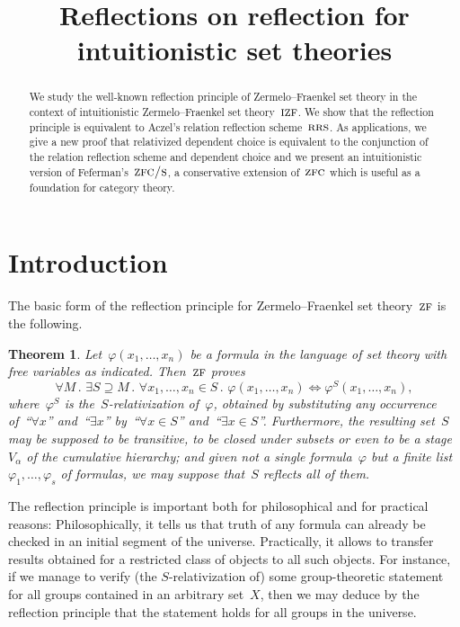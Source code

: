 \documentclass[oneside,reqno]{amsart}
\title[]{Reflections on reflection for \\ intuitionistic set theories}
\author{}
\theoremstyle{definition}
\theoremstyle{plain}
\newtheorem{thm}[defn]{Theorem}
\theoremstyle{remark}
\renewcommand{\_}{\mathpunct{.}\,}
\newcommand{\?}{\,{:}\,}
\newcommand{\ZF}{\textsc{zf}}
\newcommand{\IZF}{\textsc{izf}}
\newcommand{\ZFC}{\textsc{zfc}}
\newcommand{\ZFCS}{\textsc{zfc/s}}
\newcommand{\RRS}{\textsc{rrs}}
\begin{document}
\begin{abstract}
  We study the well-known reflection principle of Zermelo--Fraenkel set theory
  in the context of intuitionistic Zermelo--Fraenkel set theory~$\IZF$. We show
  that the reflection principle is equivalent to Aczel's relation reflection scheme~$\RRS$. As
  applications, we give a new proof that relativized dependent choice is
  equivalent to the conjunction of the relation reflection scheme and dependent
  choice and we present an intuitionistic version of Feferman's~$\ZFCS$, a
  conservative extension of~$\ZFC$ which is useful as a foundation for category
  theory.
\end{abstract}

\maketitle
\thispagestyle{empty}

\section{Introduction}

The basic form of the reflection principle for Zermelo--Fraenkel set
theory~$\ZF$ is the following.
\begin{thm}Let~$\varphi(x_1,\ldots,x_n)$ be a formula in the language of set
theory with free variables as indicated. Then~$\ZF$ proves
\[ \forall M\_
  \exists S \supseteq M\_
  \forall x_1,\ldots,x_n \in S\_
  \varphi(x_1,\ldots,x_n) \Leftrightarrow \varphi^S(x_1,\ldots,x_n), \]
where~$\varphi^S$ is the~$S$-relativization of~$\varphi$, obtained by
substituting any occurrence of~``$\forall x$'' and~``$\exists x$'' by~``$\forall
x \in S$'' and~``$\exists x \in S$''.
Furthermore, the resulting set~$S$ may be supposed to be transitive, to be closed
under subsets or even to be a stage~$V_\alpha$ of the cumulative hierarchy;
and given not a single formula~$\varphi$ but a finite
list~$\varphi_1,\ldots,\varphi_s$ of formulas, we may suppose that~$S$ reflects
all of them.
\end{thm}

The reflection principle is important both for philosophical and for practical
reasons: Philosophically, it tells us that truth of any formula can already be
checked in an initial segment of the universe. Practically, it allows to
transfer results obtained for a restricted class of objects to all such
objects. For instance, if we manage to verify (the $S$-relativization of) some
group-theoretic statement for all groups contained in an arbitrary set~$X$,
then we may deduce by the reflection principle that the statement holds
for all groups in the universe.
\end{document}
